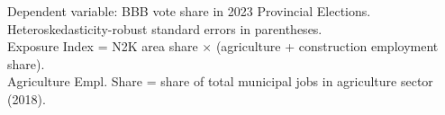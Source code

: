 \begin{table}[htbp]
{
}
   
   \par \raggedright 
   Dependent variable: BBB vote share in 2023 Provincial Elections.\\
   Heteroskedasticity-robust standard errors in parentheses.\\
   Exposure Index = N2K area share $\times$ (agriculture + construction employment share).\\
   Agriculture Empl. Share = share of total municipal jobs in agriculture sector (2018).
\end{table}
